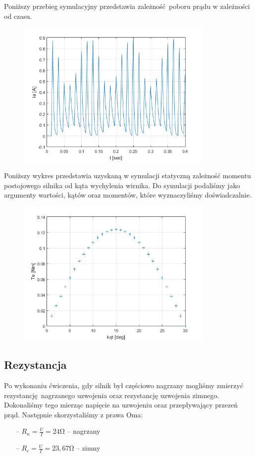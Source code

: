 \documentclass[a4paper, 12pt]{article}
\begin{document}
				Poniższy przebieg symulacyjny przedstawia zależność poboru prądu w zależności od czasu. 
				\begin{figure}[H]
					\centering
					\includegraphics[width = 0.85\textwidth]{./symulacyjne/prad_od_czasu.png}
				\end{figure} \newpage \noindent
				Poniższy wykres przedstawia uzyskaną w symulacji statyczną zależność momentu postojowego silnika od kąta wychylenia wirnika. Do symulacji podaliśmy jako argumenty wartości, kątów oraz momentów, które wyznaczyliśmy doświadczalnie.
				\begin{figure}[H]
					\centering
					\includegraphics[width = 0.85\textwidth]{./symulacyjne/moment_od_kata.png}
				\end{figure}
		\subsection{Rezystancja}
			Po wykonaniu ćwiczenia, gdy silnik był częściowo nagrzany mogliśmy zmierzyć rezystancję nagrzanego uzwojenia oraz rezystancję uzwojenia zimnego. Dokonaliśmy tego mierząc napięcie na uzwojeniu oraz przepływający przezeń prąd. Następnie skorzystaliśmy z prawa Oma:
			\begin{itemize}
				\item[--] $R_{n} = \frac{U}{I} = 24\mathrm{\Omega}$ -- nagrzany
				\item[--] $R_{c} = \frac{U}{I} = 23,67\mathrm{\Omega}$ -- zimny
			\end{itemize}
\end{document}
